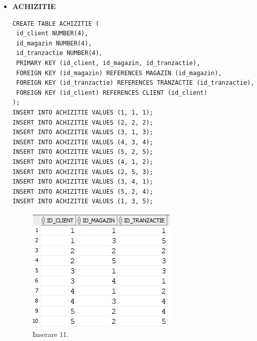 \begin{itemize}
    \item \textbf{ACHIZITIE}
    \vspace{0.2cm}
    \begin{lstlisting}
CREATE TABLE ACHIZITIE (
 id_client NUMBER(4),
 id_magazin NUMBER(4),
 id_tranzactie NUMBER(4),
 PRIMARY KEY (id_client, id_magazin, id_tranzactie),
 FOREIGN KEY (id_magazin) REFERENCES MAGAZIN (id_magazin),
 FOREIGN KEY (id_tranzactie) REFERENCES TRANZACTIE (id_tranzactie),
 FOREIGN KEY (id_client) REFERENCES CLIENT (id_client)
);
INSERT INTO ACHIZITIE VALUES (1, 1, 1);
INSERT INTO ACHIZITIE VALUES (2, 2, 2);
INSERT INTO ACHIZITIE VALUES (3, 1, 3);
INSERT INTO ACHIZITIE VALUES (4, 3, 4);
INSERT INTO ACHIZITIE VALUES (5, 2, 5);
INSERT INTO ACHIZITIE VALUES (4, 1, 2);
INSERT INTO ACHIZITIE VALUES (2, 5, 3);
INSERT INTO ACHIZITIE VALUES (3, 4, 1);
INSERT INTO ACHIZITIE VALUES (5, 2, 4);
INSERT INTO ACHIZITIE VALUES (1, 3, 5);
    \end{lstlisting}
    \vspace{0.2cm}
    \begin{figure}[h]
      \centerline{\includegraphics{images/inserare11.png}}
      \caption{ Inserare 11.}
    \end{figure}
    \vspace{0.5cm}


\end{itemize}
